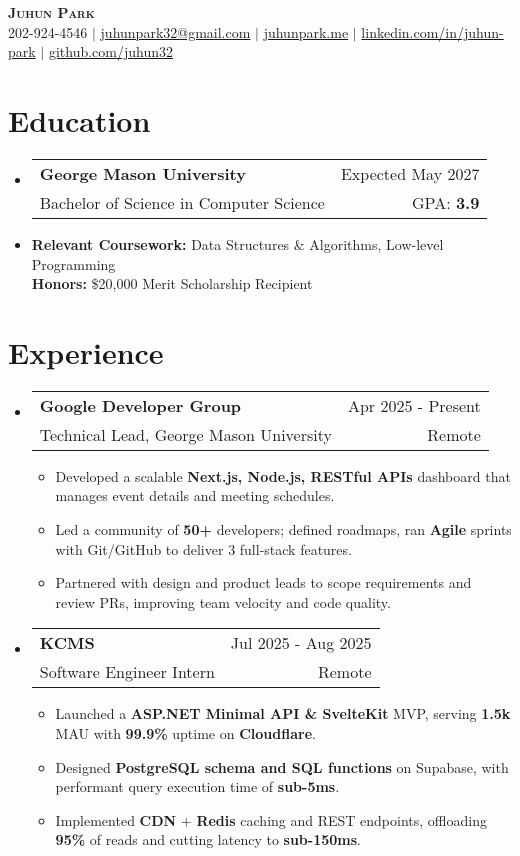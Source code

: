 \documentclass[letterpaper,11pt]{article}
\makeatletter
\newcommand{\resumeItem}[1]{
  \item{
    {#1}
  }
}
\newcommand{\resumeSubheading}[4]{
    \item
    \begin{tabular*}{0.985\textwidth}[t]{l@{\extracolsep{\fill}}r@{\hspace{-0.1in}}}
        {\textbf{#1}} & {#2} \\
        #3 &  #4 \\
    \end{tabular*}\vspace{-5pt}
}
\newcommand{\resumeSubHeadingListStart}{\begin{itemize}[leftmargin=0.00in, rightmargin=-0.2in, label={}]\vspace{3pt}}
\newcommand{\resumeSubHeadingListEnd}{\end{itemize}\vspace{-5pt}}
\newcommand{\resumeItemListStart}{\vspace{3pt}\begin{itemize}[leftmargin=0.15in, rightmargin=0.15in]}
\newcommand{\resumeItemListEnd}{\end{itemize}\vspace{-5pt}}
\makeatother
\begin{document}

\begin{center}
  \textbf{\Huge \scshape {Juhun Park}} \\ \vspace{3pt}
   202-924-4546 $|$
  \href{mailto:juhunpark32@gmail.com}{juhunpark32@gmail.com} $|$
  \href{https://www.juhunpark.me/}{juhunpark.me} $|$
  \href{https://linkedin.com/in/juhun-park}{linkedin.com/in/juhun-park} $|$
  \href{https://github.com/juhun32}{github.com/juhun32} \\
\end{center}

\vspace{-10pt}


\section{Education}
\resumeSubHeadingListStart
\resumeSubheading
{George Mason University}{Expected May 2027}
{Bachelor of Science in Computer Science}{GPA: \textbf{3.9}}
\resumeItem{\textbf{Relevant Coursework: } Data Structures \& Algorithms, Low-level Programming} \\
{\textbf{Honors: }{\$20,000 Merit Scholarship Recipient}}
\resumeSubHeadingListEnd

\vspace{-10pt}


\section{Experience}

\resumeSubHeadingListStart
\resumeSubheading
{Google Developer Group} {Apr 2025 - Present}
{Technical Lead, George Mason University} {Remote}
\resumeItemListStart
\resumeItem{Developed a scalable \textbf{Next.js, Node.js, RESTful APIs} dashboard that manages event details and meeting schedules.}
\resumeItem{Led a community of \textbf{50+} developers; defined roadmaps, ran \textbf{Agile} sprints with Git/GitHub to deliver 3 full-stack features.}
\resumeItem{Partnered with design and product leads to scope requirements and review PRs, improving team velocity and code quality.}
\resumeItemListEnd
\resumeSubHeadingListEnd

\resumeSubHeadingListStart
\resumeSubheading
{KCMS} {Jul 2025 - Aug 2025}
{Software Engineer Intern} {Remote}
\resumeItemListStart
\resumeItem{Launched a \textbf{ASP.NET Minimal API \& SvelteKit} MVP, serving \textbf{1.5k} MAU with \textbf{99.9\%} uptime on \textbf{Cloudflare}.}
\resumeItem{Designed \textbf{PostgreSQL schema and SQL functions} on Supabase, with performant query execution time of \textbf{sub-5ms}.}
\resumeItem{Implemented \textbf{CDN} + \textbf{Redis} caching and REST endpoints, offloading \textbf{95\%} of reads and cutting latency to \textbf{sub-150ms}.}
\resumeItemListEnd
\resumeSubHeadingListEnd
\end{document}
